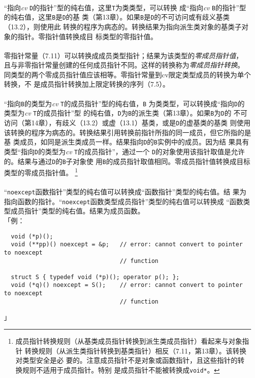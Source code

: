 \paragraph{}
``指向\textit{cv} \texttt{D}的指针''型的纯右值，这里\texttt{T}为类类型，可以转换
成``指向\textit{cv} \texttt{B}的指针''型的纯右值，这里\texttt{B}是\texttt{D}的基
类（第13章）。如果\texttt{B}是\texttt{D}的不可访问或有歧义基类（13.2），则使用此
转换的程序为病态的。转换结果为指向派生类对象的基类子对象的指针。零指针值转换成目
标类型的零指针值。

\paragraph{}
零指针常量（7.11）可以转换成成员类型指针；结果为该类型的\textit{零成员指针值}，
且与非零指针常量创建的任何成员指针不同。这样的转换称为\textit{零成员指针转换}。
同类型的两个零成员指针值应该相等。零指针常量到cv限定类型成员的转换为单个转换，不
是成员指针转换加上限定转换的序列（7.5）。

\paragraph{}
``指向\texttt{B}的类型为\textit{cv} \texttt{T}的成员指针''型的纯右值，\texttt{B}
为类类型，可以转换成``指向\texttt{D}的类型为\textit{cv} \texttt{T}的成员指针''型
的纯右值，\texttt{D}为\texttt{B}的派生类（第13章）。如果\texttt{B}为\texttt{D}的
不可访问（第14章），有歧义（13.2）或虚（13.1）基类，或是\texttt{D}的虚基类的基类
则使用该转换的程序为病态的。转换结果引用转换前指针所指的同一成员，但它所指的是基
类成员，如同是派生类成员一样。结果指向\texttt{D}的\texttt{B}实例中的成员。因为结
果具有类型``指向\texttt{D}的类型为\textit{cv} \texttt{T}的成员指针''，通过一个
\texttt{D}的对象使用该指针取值是允许的。结果与通过\texttt{D}的\texttt{B}子对象使
用\texttt{B}的成员指针取值相同。零成员指针值转换成目标类型的零成员指针值。
\footnote{成员指针转换规则（从基类成员指针转换到派生类成员指针）看起来与对象指针
转换规则（从派生类指针转换到基类指针）相反（7.11，第13章）。该转换对类型安全是必
要的。注意成员指针不是对象或函数指针，且这些指针的转换规则不适用于成员指针。特别
是成员指针不能被转换成\texttt{void*}。}

\paragraph{}
``\texttt{noexcept}函数指针''类型的纯右值可以转换成``函数指针''类型的纯右值。结
果为指向函数的指针。``\texttt{noexcept}函数类型成员指针''类型的纯右值可以转换成
``函数类型成员指针''类型的纯右值。结果为成员函数。                            \\
「例：
\begin{lstlisting}
  void (*p)();
  void (**pp)() noexcept = &p;   // error: cannot convert to pointer to noexcept
                                 // function

  struct S { typedef void (*p)(); operator p(); };
  void (*q)() noexcept = S();    // error: cannot convert to pointer to noexcept
                                 // function
\end{lstlisting}」

